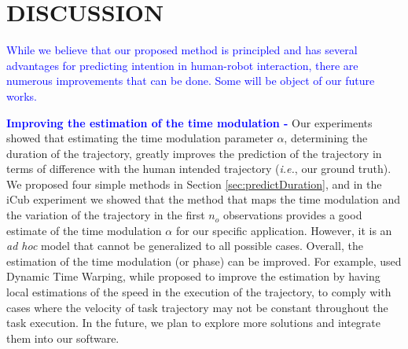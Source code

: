 \documentclass[utf8]{frontiersSCNS} %
\newcommand{\rev}[1]{\textcolor{blue}{#1}}
\newcommand{\todo}[1]{\textcolor{red}{\textbf{/*#1*/}}}
\begin{document}
%


\section{DISCUSSION} \label{sec:discussion}

\rev{While we believe that our proposed method is principled and has several advantages for predicting intention in human-robot interaction, there are numerous improvements that can be done. Some will be object of our future works.}

\rev{\textbf{Improving the estimation of the time modulation -}} Our experiments showed that estimating the time modulation parameter $\alpha$, determining the duration of the trajectory, greatly improves the prediction of the trajectory in terms of difference with the human intended trajectory (\textit{i.e.}, our ground truth). We proposed four simple methods in Section \ref{sec:predictDuration}, and in the iCub experiment we showed that the method that maps the time modulation and the variation of the trajectory in the first $n_o$ observations 
provides a good estimate of the time modulation $\alpha$ for our specific application. However, it is an \textit{ad hoc} model that cannot be generalized to all possible cases.
Overall, the estimation of the time modulation (or phase) can be improved.
For example, \cite{maeda2016probabilistic} used Dynamic Time Warping, while  \cite{ewerton2015learning} proposed to improve the estimation by having local estimations of the speed in the execution of the trajectory, to comply with cases where the velocity of task trajectory may not be constant throughout the task execution.
In the future, we plan to explore more solutions and integrate them into our software.
\end{document}
